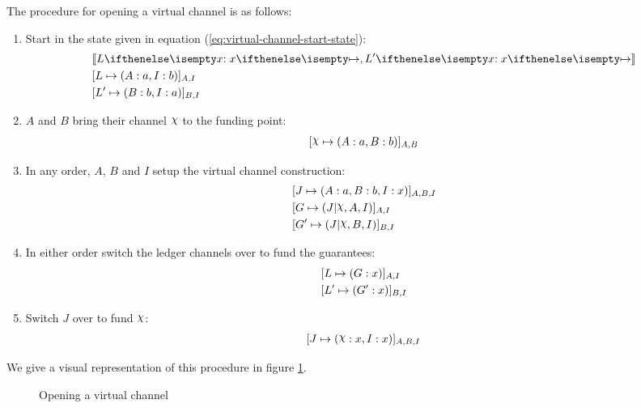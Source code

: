 \documentclass{article}
\begin{document}
The procedure for opening a virtual channel is as follows:
\begin{enumerate}
  \item Start in the state given in equation (\ref{eq:virtual-channel-start-state}):
  \begin{align}
    & \adj{\holds{L}{x}{}, \holds{L'}{x}{}}\\
    & \finalizable{L}{\alloc{A:a, I:b}}{A, I} \\
    & \finalizable{L'}{\alloc{B: b, I: a}}{B, I}
  \end{align}
  \item $A$ and $B$ bring their channel $\rchi$ to the funding point:
  \begin{align}
    \finalizable{\rchi}{\alloc{A:a, B:b}}{A,B}
  \end{align}
  \item In any order, $A$, $B$ and $I$ setup the virtual channel construction:
  \begin{align}
    & \finalizable{J}{\alloc{A:a, B:b, I: x}}{A, B, I} \\
    & \finalizable{G}{\guar{J}{\rchi, A, I}}{A, I} \\
    & \finalizable{G'}{\guar{J}{\rchi, B, I}}{B, I}
  \end{align}
  \item In either order switch the ledger channels over to fund the guarantees:
  \begin{align}
    & [L \mapsto ( G: x )]_{A,I} \\
    & [L' \mapsto ( G': x )]_{B,I}
  \end{align}
  \item Switch $J$ over to fund $\rchi$:
  \begin{align}
    \finalizable{J}{\alloc{\rchi: x, I: x}}{A, B, I}
  \end{align}
\end{enumerate}
We give a visual representation of this procedure in figure \ref{fig:virtual-channel-opening}.

\begin{figure}[ht]
  \centering
  
  \caption{Opening a virtual channel}
  \label{fig:virtual-channel-opening}
\end{figure}
\end{document}

